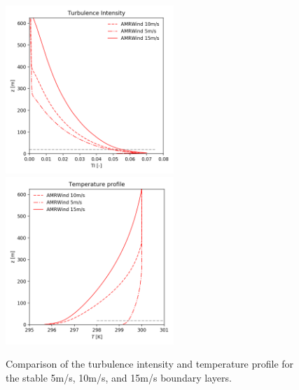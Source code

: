 \begin{figure}[hbt!]
  \centering
  \includegraphics[width=2.5in]{figures/AMRWind_allWS/AMRWind_stable_TI.png}
  \includegraphics[width=2.5in]{figures/AMRWind_allWS/AMRWind_stable_T.png}
  \caption{ \label{fig:CompareAMRallTTI} Comparison of the turbulence
    intensity and temperature profile for the stable 5m/s, 10m/s, and
    15m/s boundary layers. }
\end{figure}



